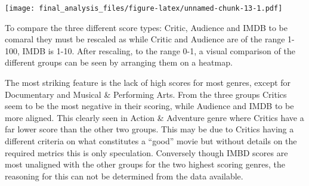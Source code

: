 \documentclass[]{article}
\newenvironment{Shaded}{\begin{snugshade}}{\end{snugshade}}
\newcommand{\KeywordTok}[1]{\textcolor[rgb]{0.13,0.29,0.53}{\textbf{#1}}}
\newcommand{\DataTypeTok}[1]{\textcolor[rgb]{0.13,0.29,0.53}{#1}}
\newcommand{\DecValTok}[1]{\textcolor[rgb]{0.00,0.00,0.81}{#1}}
\newcommand{\FloatTok}[1]{\textcolor[rgb]{0.00,0.00,0.81}{#1}}
\newcommand{\StringTok}[1]{\textcolor[rgb]{0.31,0.60,0.02}{#1}}
\newcommand{\OperatorTok}[1]{\textcolor[rgb]{0.81,0.36,0.00}{\textbf{#1}}}
\newcommand{\NormalTok}[1]{#1}
\begin{document}
\begin{Shaded}
\end{Shaded}

\texttt{[image: final\_analysis\_files/figure-latex/unnamed-chunk-13-1.pdf]}

To compare the three different score types: Critic, Audience and IMDB to
be comaral they must be rescaled as while Critic and Audience are of the
range 1-100, IMDB is 1-10. After rescaling, to the range 0-1, a visual
comparison of the different groups can be seen by arranging them on a
heatmap.

The most striking feature is the lack of high scores for most genres,
except for Documentary and Musical \& Performing Arts. From the three
groups Critics seem to be the most negative in their scoring, while
Audience and IMDB to be more aligned. This clearly seen in Action \&
Adventure genre where Critics have a far lower score than the other two
groups. This may be due to Critics having a different criteria on what
constitutes a ``good'' movie but without details on the required metrics
this is only speculation. Conversely though IMBD scores are most
unaligned with the other groups for the two highest scoring genres, the
reasoning for this can not be determined from the data available.
\end{document}

